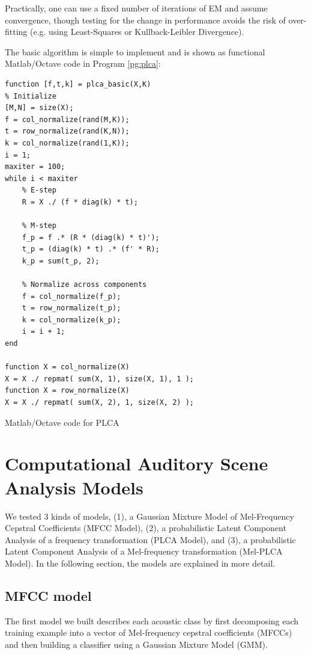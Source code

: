 \documentclass[a4paper,10pt,final]{ThesisStyle}
\begin{document}
Practically, one can use a fixed number of iterations of EM and assume convergence, though testing for the change in performance avoids the risk of over-fitting \cite{Hofmann1999} (e.g. using Least-Squares or Kullback-Leibler Divergence).   

The basic algorithm is simple to implement and is shown as functional Matlab/Octave code in Program \ref{pg:plca}: 


\begin{program}
  \begin{verbatim}
function [f,t,k] = plca_basic(X,K)
% Initialize
[M,N] = size(X);
f = col_normalize(rand(M,K));
t = row_normalize(rand(K,N));
k = col_normalize(rand(1,K));
i = 1;
maxiter = 100;
while i < maxiter
    % E-step
    R = X ./ (f * diag(k) * t);
    
    % M-step
    f_p = f .* (R * (diag(k) * t)');
    t_p = (diag(k) * t) .* (f' * R);
    k_p = sum(t_p, 2);
    
    % Normalize across components
    f = col_normalize(f_p);
    t = row_normalize(t_p);
    k = col_normalize(k_p);
    i = i + 1;
end

function X = col_normalize(X)
X = X ./ repmat( sum(X, 1), size(X, 1), 1 );
function X = row_normalize(X)
X = X ./ repmat( sum(X, 2), 1, size(X, 2) );
\end{verbatim}
  \caption{Matlab/Octave code for PLCA}
\label{pg:plca}
\end{program}


\section{Computational Auditory Scene Analysis Models}

We tested 3 kinds of models, (1), a Gaussian Mixture Model of Mel-Frequency Cepstral Coefficients (MFCC Model), (2), a probabilistic Latent Component Analysis of a frequency transformation (PLCA Model), and (3), a probabilistic Latent Component Analysis of a Mel-frequency transformation (Mel-PLCA Model).  In the following section, the models are explained in more detail.

\subsection{MFCC model}
The first model we built describes each acoustic class by first decomposing each training example into a vector of Mel-frequency cepstral coefficients (MFCCs) and then building a classifier using a Gaussian Mixture Model (GMM).  
\end{document}
